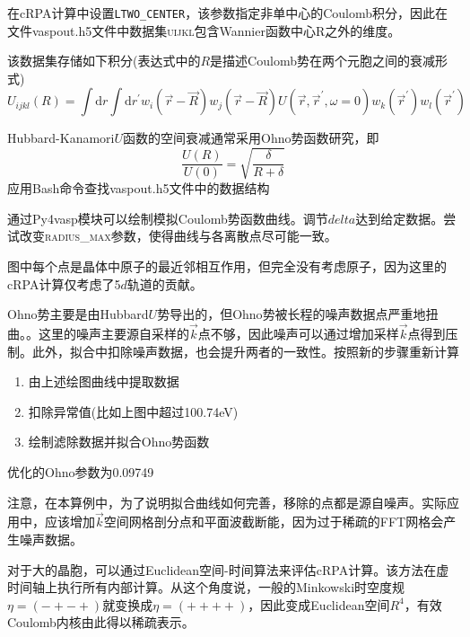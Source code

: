 在\textrm{cRPA}计算中设置\texttt{LTWO\_CENTER}，该参数指定非单中心的\textrm{Coulomb}积分，因此在文件\textrm{vaspout.h5}文件中数据集\textsc{uijkl}包含\textrm{Wannier}函数中心\textsc{R}之外的维度。

该数据集存储如下积分(表达式中的$R$是描述\textrm{Coulomb}势在两个元胞之间的衰减形式)
\begin{displaymath}
	U_{ijkl}(R)=\int\mathrm{d}r\int\mathrm{d}r^{\prime}w_i(\vec r-\vec R)w_j(\vec r-\vec R)U(\vec r,\vec r^{\prime},\omega=0)w_k(\vec r^{\prime})w_l(\vec r^{\prime})
\end{displaymath}

\textrm{Hubbard-Kanamori}$U$函数的空间衰减通常采用\textrm{Ohno}势函数研究，即
\begin{displaymath}
	\dfrac{U(R)}{U(0)}=\sqrt{\dfrac{\delta}{R+\delta}}
\end{displaymath}
应用\textrm{Bash}命令查找\textrm{vaspout.h5}文件中的数据结构

通过\textrm{Py4vasp}模块可以绘制模拟\textrm{Coulomb}势函数曲线。调节$delta$达到给定数据。尝试改变\textsc{radius\_max}参数，使得曲线与各离散点尽可能一致。

图中每个点是晶体中原子的最近邻相互作用，但完全没有考虑原子，因为这里的\textrm{cRPA}计算仅考虑了5$d$轨道的贡献。

\textrm{Ohno}势主要是由\textrm{Hubbard}$U$势导出的，但\textrm{Ohno}势被长程的噪声数据点严重地扭曲。。这里的噪声主要源自采样的$\vec k$点不够，因此噪声可以通过增加采样$\vec k$点得到压制。此外，拟合中扣除噪声数据，也会提升两者的一致性。按照新的步骤重新计算
\begin{enumerate}
	\item 由上述绘图曲线中提取数据
	\item 扣除异常值(比如上图中超过10\textrm{0.74eV})
	\item 绘制滤除数据并拟合\textrm{Ohno}势函数
\end{enumerate}

优化的\textrm{Ohno}参数为0.09749

注意，在本算例中，为了说明拟合曲线如何完善，移除的点都是源自噪声。实际应用中，应该增加$\vec k$空间网格剖分点和平面波截断能，因为过于稀疏的\textrm{FFT}网格会产生噪声数据。

对于大的晶胞，可以通过\textrm{Euclidean}空间-时间算法来评估\textrm{cRPA}计算。该方法在虚时间轴上执行所有内部计算。从这个角度说，一般的\textrm{Minkowski}时空度规$\eta=(-+-+)$就变换成$\eta=(++++)$，因此变成\textrm{Euclidean}空间$R^4$，有效\textrm{Coulomb}内核由此得以稀疏表示。

